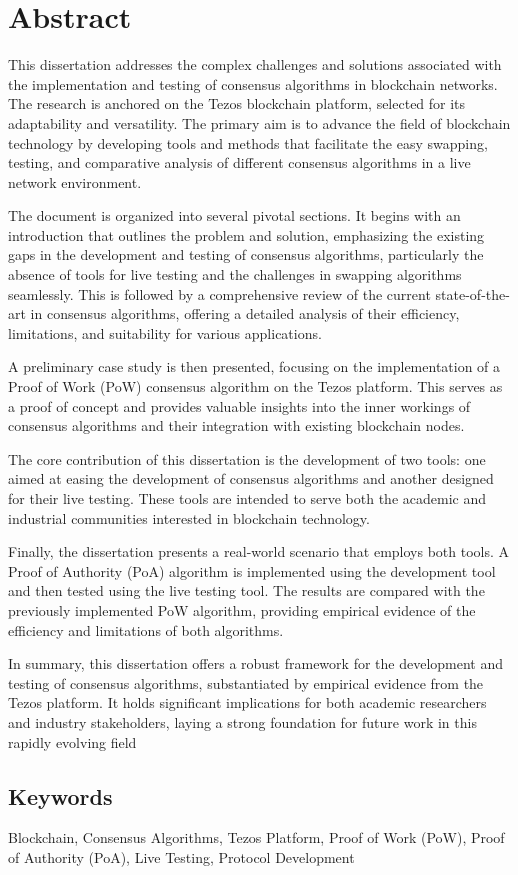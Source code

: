 \chapter*{Abstract}
This dissertation addresses the complex challenges and solutions associated with the implementation and testing of consensus algorithms in blockchain networks. The research is anchored on the Tezos blockchain platform, selected for its adaptability and versatility. The primary aim is to advance the field of blockchain technology by developing tools and methods that facilitate the easy swapping, testing, and comparative analysis of different consensus algorithms in a live network environment.

The document is organized into several pivotal sections. It begins with an introduction that outlines the problem and solution, emphasizing the existing gaps in the development and testing of consensus algorithms, particularly the absence of tools for live testing and the challenges in swapping algorithms seamlessly. This is followed by a comprehensive review of the current state-of-the-art in consensus algorithms, offering a detailed analysis of their efficiency, limitations, and suitability for various applications.

A preliminary case study is then presented, focusing on the implementation of a Proof of Work (PoW) consensus algorithm on the Tezos platform. This serves as a proof of concept and provides valuable insights into the inner workings of consensus algorithms and their integration with existing blockchain nodes.

The core contribution of this dissertation is the development of two tools: one aimed at easing the development of consensus algorithms and another designed for their live testing. These tools are intended to serve both the academic and industrial communities interested in blockchain technology.

Finally, the dissertation presents a real-world scenario that employs both tools. A Proof of Authority (PoA) algorithm is implemented using the development tool and then tested using the live testing tool. The results are compared with the previously implemented PoW algorithm, providing empirical evidence of the efficiency and limitations of both algorithms.

In summary, this dissertation offers a robust framework for the development and testing of consensus algorithms, substantiated by empirical evidence from the Tezos platform. It holds significant implications for both academic researchers and industry stakeholders, laying a strong foundation for future work in this rapidly evolving field


\section*{Keywords}
Blockchain, Consensus Algorithms, Tezos Platform, Proof of Work (PoW), Proof of Authority (PoA), Live Testing, Protocol Development
